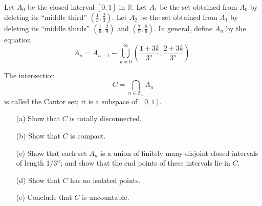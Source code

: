   \begin{exercise}[Munkres 27.6]
    Let $A_0$ be the closed interval $[0, 1]$ in $\mathbb{R}$. Let $A_1$ be the set obtained from $A_0$ by deleting its ``middle third'' $(\frac{1}{3}, \frac{2}{3})$. Let $A_2$ be the set obtained from $A_1$ by deleting its ``middle thirds'' $(\frac{1}{9}, \frac{2}{9})$ and $(\frac{7}{9}, \frac{8}{9})$. In general, define $A_n$ by the equation
    \[
      A_n = A_{n-1} - \bigcup_{k=0}^{\infty}\left(\frac{1+3k}{3^n}, \frac{2+3k}{3^n}\right).
    \]
    
    The intersection
    \[
      C = \bigcap_{n\in\mathbb{Z}_+} A_n
    \]
    is called the Cantor set; it is a subspace of $[0, 1]$.
    \begin{enumerate}
      \item[(a)] Show that $C$ is totally disconnected.
      \item[(b)] Show that $C$ is compact.
      \item[(c)] Show that each set $A_n$ is a union of finitely many disjoint closed intervals of length $1/3^n$; and show that the end points of these intervals lie in $C$.
      \item[(d)] Show that $C$ has no isolated points.
      \item[(e)] Conclude that $C$ is uncountable.
    \end{enumerate}
  \end{exercise}
